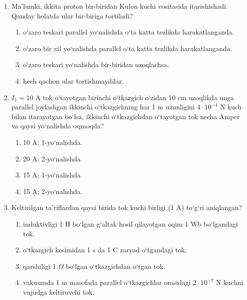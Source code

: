 \begin{enumerate}
\item Ma’lumki, ikkita proton bir-biridan Kulon kuchi vositasida itarishishadi. Qanday holatda ular bir-biriga tortiladi?
\begin{enumerate}[label=\Alph*)]
\item o‘zaro teskari parallel yo‘nalishda o‘ta katta tezlikda harakatlanganda.
\item o‘zaro bir xil yo‘nalishda parallel o‘ta katta tezlikda harakatlanganda.
\item o‘zaro teskari yo‘nalishda bir-biridan uzoqlashsa.
\item hech qachon ular tortishmaydilar.
\end{enumerate}

\item $I_1=10$ A tok o‘tayotgan birinchi o‘tkazgich o‘zidan 10 cm uzoqlikda unga parallel joylashgan ikkinchi o‘tkazgichning har 1 m uzunligini $4 \cdot 10^{-4}$ N kuch bilan itarayotgan bo‘lsa, ikkinchi o‘tkazgichdan o‘tayotgan tok necha Amper va qaysi yo‘nalishda oqmoqda?


\begin{enumerate}[label=\Alph*)]
\item 10 A; 1-yo‘nalishda.
\item 20 A; 2-yo‘nalishda.
\item 15 A; 1-yo‘nalishda.
\item 15 A; 2-yo‘nalishda.
\end{enumerate}

\item Keltirilgan ta’riflardan qaysi birida tok kuchi birligi (1 A) to‘g‘ri aniqlangan?
\begin{enumerate}[label=\Alph*)]
\item induktivligi 1 H bo‘lgan g‘altak hosil qilayotgan oqim 1 Wb bo‘lgandagi tok.
\item o‘tkazgich kesimidan 1 s da 1 C zaryad o‘tgandagi tok.
\item qarshiligi 1 $\Omega$ bo‘lgan o‘tkazgichdan o‘tgan tok.
\item vakuumda 1 m masofada parallel o‘tkazgichlar orasidagi $2 \cdot 10^{-7}$ N kuchni vujudga keltiruvchi tok.
\end{enumerate}

\end{enumerate}



